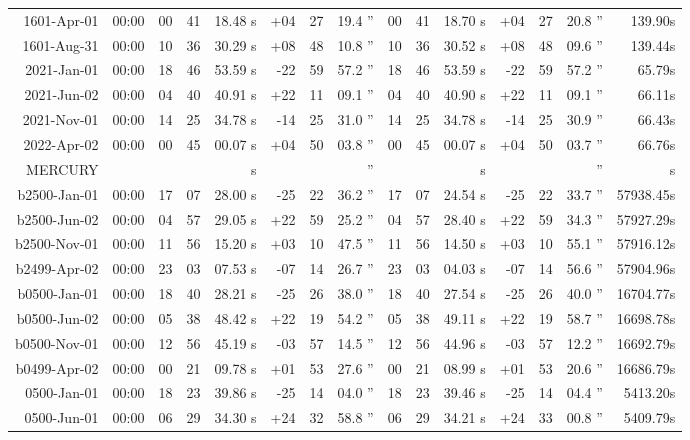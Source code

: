\begin{longtable}{r@{\,}r|r@{h\,}r@{m\,}r<{s}|r@{°\,}r@{'\,}r<{''}||r@{h\,}r@{m\,}r<{s}|r@{°\,}r@{'\,}r<{''}r<{s}}
 1601-Apr-01 & 00:00  &   00 & 41 & 18.48 & +04 & 27 & 19.4 & 00&41&18.70 & +04&27&20.8 & 139.90\\ %
 1601-Aug-31 & 00:00  &   10 & 36 & 30.29 & +08 & 48 & 10.8 & 10&36&30.52 & +08&48&09.6 & 139.44\\ %
 2021-Jan-01 & 00:00  &   18 & 46 & 53.59 & -22 & 59 & 57.2 & 18&46&53.59 & -22&59&57.2 & 65.79\\ %
 2021-Jun-02 & 00:00  &   04 & 40 & 40.91 & +22 & 11 & 09.1 & 04&40&40.90 & +22&11&09.1 & 66.11\\ %
 2021-Nov-01 & 00:00  &   14 & 25 & 34.78 & -14 & 25 & 31.0 & 14&25&34.78 & -14&25&30.9 & 66.43\\ %
 2022-Apr-02 & 00:00  &   00 & 45 & 00.07 & +04 & 50 & 03.8 & 00&45&00.07 & +04&50&03.7 & 66.76\\ %
MERCURY  \\
b2500-Jan-01 & 00:00  &   17 & 07 & 28.00 & -25 & 22 & 36.2 & 17&07&24.54 & -25&22&33.7 & 57938.45\\ %
b2500-Jun-02 & 00:00  &   04 & 57 & 29.05 & +22 & 59 & 25.2 & 04&57&28.40 & +22&59&34.3 & 57927.29\\ %
b2500-Nov-01 & 00:00  &   11 & 56 & 15.20 & +03 & 10 & 47.5 & 11&56&14.50 & +03&10&55.1 & 57916.12\\ %
b2499-Apr-02 & 00:00  &   23 & 03 & 07.53 & -07 & 14 & 26.7 & 23&03&04.03 & -07&14&56.6 & 57904.96\\ %
b0500-Jan-01 & 00:00  &   18 & 40 & 28.21 & -25 & 26 & 38.0 & 18&40&27.54 & -25&26&40.0 & 16704.77\\ %
b0500-Jun-02 & 00:00  &   05 & 38 & 48.42 & +22 & 19 & 54.2 & 05&38&49.11 & +22&19&58.7 & 16698.78\\ %
b0500-Nov-01 & 00:00  &   12 & 56 & 45.19 & -03 & 57 & 14.5 & 12&56&44.96 & -03&57&12.2 & 16692.79\\ %
b0499-Apr-02 & 00:00  &   00 & 21 & 09.78 & +01 & 53 & 27.6 & 00&21&08.99 & +01&53&20.6 & 16686.79\\ %
 0500-Jan-01 & 00:00  &   18 & 23 & 39.86 & -25 & 14 & 04.0 & 18&23&39.46 & -25&14&04.4 & 5413.20\\ %
 0500-Jun-01 & 00:00  &   06 & 29 & 34.30 & +24 & 32 & 58.8 & 06&29&34.21 & +24&33&00.8 & 5409.79\\ %

\end{longtable}
